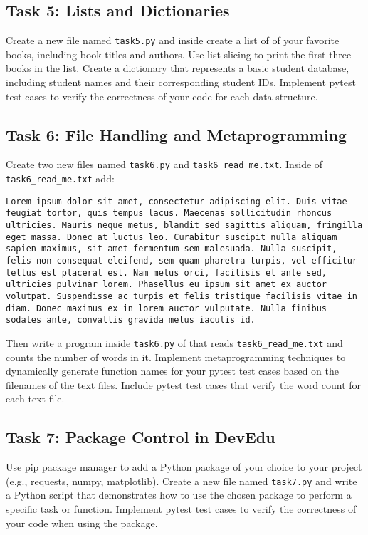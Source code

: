 \documentclass{article}
\begin{document}
\subsection{Task 5: Lists and Dictionaries}
Create a new file named \verb|task5.py| and inside create a list of of your favorite books, including book titles and authors. Use list slicing to print the first three books in the list. Create a dictionary that represents a basic student database, including student names and their corresponding student IDs. Implement pytest test cases to verify the correctness of your code for each data structure.


\subsection{Task 6: File Handling and Metaprogramming}
Create two new files named \verb|task6.py| and \verb|task6_read_me.txt|. Inside of \verb|task6_read_me.txt| add:
\begin{center} %
\begin{lstlisting}[style=customcode]
Lorem ipsum dolor sit amet, consectetur adipiscing elit. Duis vitae feugiat tortor, quis tempus lacus. Maecenas sollicitudin rhoncus ultricies. Mauris neque metus, blandit sed sagittis aliquam, fringilla eget massa. Donec at luctus leo. Curabitur suscipit nulla aliquam sapien maximus, sit amet fermentum sem malesuada. Nulla suscipit, felis non consequat eleifend, sem quam pharetra turpis, vel efficitur tellus est placerat est. Nam metus orci, facilisis et ante sed, ultricies pulvinar lorem. Phasellus eu ipsum sit amet ex auctor volutpat. Suspendisse ac turpis et felis tristique facilisis vitae in diam. Donec maximus ex in lorem auctor vulputate. Nulla finibus sodales ante, convallis gravida metus iaculis id.
\end{lstlisting}
\end{center}

Then write a program inside \verb|task6.py| of that reads \verb|task6_read_me.txt| and counts the number of words in it. Implement metaprogramming techniques to dynamically generate function names for your pytest test cases based on the filenames of the text files. Include pytest test cases that verify the word count for each text file.

\subsection{Task 7: Package Control in DevEdu}
Use pip package manager to add a Python package of your choice to your project (e.g., requests, numpy, matplotlib). Create a new file named \verb|task7.py| and write a Python script that demonstrates how to use the chosen package to perform a specific task or function. Implement pytest test cases to verify the correctness of your code when using the package.
\end{document}
